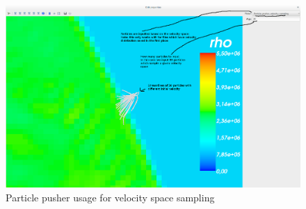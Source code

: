 \documentclass[a4paper,10pt]{article}
\begin{document}
\begin{figure}[H]
 \centering
 \includegraphics[width=\textwidth]{./images/particlepushersampling.png}
 \caption{Particle pusher usage for velocity space sampling}
 \label{fig:particle2}
\end{figure}
\end{document}
